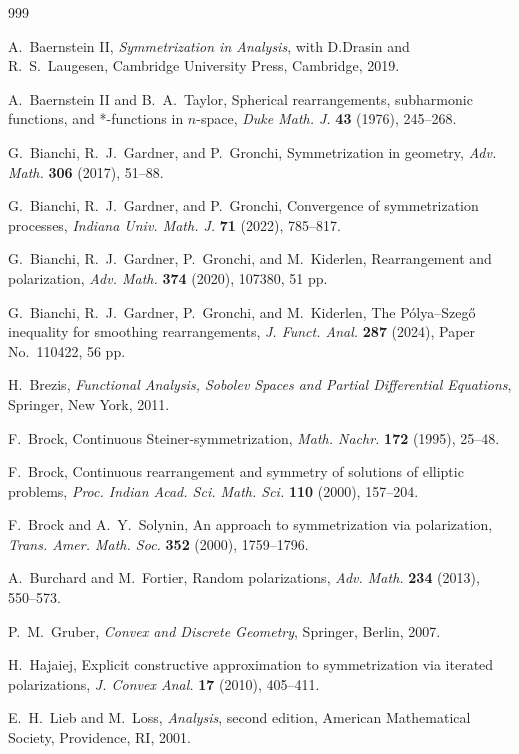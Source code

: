 \documentclass[12pt,reqno]{amsart}
\numberwithin{equation}{section}
\begin{document}
\begin{thebibliography}{999}

A.~Baernstein II, {\em Symmetrization in Analysis}, with D.Drasin and R.~S.~Laugesen, Cambridge University Press, Cambridge, 2019.

A.~Baernstein II and B.~A.~Taylor, Spherical rearrangements, subharmonic functions, and *-functions in $n$-space, {\em Duke Math. J.} {\bf 43} (1976), 245--268.

G.~Bianchi, R.~J.~Gardner, and P.~Gronchi, Symmetrization in geometry, {\em Adv. Math.} {\bf 306} (2017), 51--88.

G.~Bianchi, R.~J.~Gardner, and P.~Gronchi,  Convergence of symmetrization processes, {\em Indiana Univ. Math. J.} {\bf 71} (2022), 785--817.

G.~Bianchi, R.~J.~Gardner, P.~Gronchi, and M.~Kiderlen, Rearrangement and polarization, {\em Adv. Math.} {\bf 374} (2020), 107380, 51 pp.

G.~Bianchi, R.~J.~Gardner, P.~Gronchi, and M.~Kiderlen, The P\'olya--Szeg\H{o} inequality for smoothing rearrangements, {\em J. Funct. Anal.} {\bf 287} (2024), Paper No.~110422, 56 pp.

H.~Brezis, {\em Functional Analysis, Sobolev Spaces and Partial Differential Equations}, Springer, New York, 2011.

F.~Brock, Continuous Steiner-symmetrization, {\em Math. Nachr.} {\bf 172} (1995), 25--48.

F.~Brock, Continuous rearrangement and symmetry of solutions of elliptic problems, {\em Proc. Indian Acad. Sci. Math. Sci.} {\bf 110} (2000), 157--204.

F.~Brock and A.~Y.~Solynin, An approach to symmetrization via polarization, {\em Trans. Amer. Math. Soc.} {\bf 352} (2000), 1759--1796.

A.~Burchard and M.~Fortier, Random polarizations, {\em Adv. Math.} {\bf 234} (2013), 550--573.

P.~M.~Gruber, {\em Convex and Discrete Geometry}, Springer, Berlin, 2007.

H.~Hajaiej, Explicit constructive approximation to symmetrization via iterated polarizations, {\em J. Convex Anal.} {\bf 17} (2010), 405--411.

E.~H.~Lieb and M.~Loss, {\em Analysis}, second edition, American Mathematical Society, Providence, RI, 2001.


\end{thebibliography}
\end{document}
